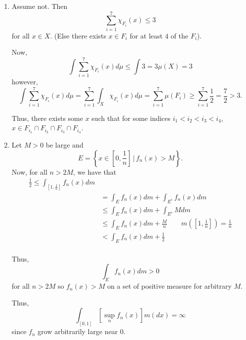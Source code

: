 \documentclass[12pt]{Qual}
\begin{document}
\begin{solution}$\,$
\begin{enumerate}[label=(\alph*)]
    \item Assume not. Then $$\sum_{i=1}^7\chi_{F_i}(x)\le3$$ for all $x\in X$. (Else there exists $x\in F_i$ for at least $4$ of the $F_i$).

    Now, $$\int\sum_{i=1}^7\chi_{F_i}(x)d\mu\le\int 3=3\mu(X)=3$$ however, $$\int\sum_{i=1}^7\chi_{F_i}(x)d\mu=\sum_{i=1}^7\int_X\chi_{F_i}(x)d\mu=\sum_{i=1}^7\mu(F_i)\ge\sum_{i=1}^7\frac{1}{2}=\frac{7}{2}>3.$$

    Thus, there exists some $x$ such that for some indices $i_1<i_2<i_3<i_4$, $x\in F_{i_1}\cap F_{i_2}\cap F_{i_3}\cap F_{i_4}$.
    \item Let $M>0$ be large and $$E=\left\{x\in\left[0,\frac{1}{n}\right]\,|\,f_n(x)>M\right\}.$$ Now, for all $n>2M$, we have that \begin{align*}
        \frac{1}{2}\le\int_{[1,\frac{1}{n}]}f_n(x)dm\\
        &=\int_Ef_n(x)dm+\int_{E^c}f_n(x)dm\\
        &\le\int_E f_n(x)dm+\int_{E^c}Mdm\\
        &\le \int_E f_n(x)dm+\frac{M}{n}\qquad m\left(\left[1,\frac{1}{n}\right]\right)=\frac{1}{n}\\
        &<\int_E f_n(x)dm+\frac{1}{2}\\
    \end{align*}

    Thus, $$\int_E f_n(x)dm>0$$ for all $n>2M$ so $f_n(x)>M$ on a set of positive measure for arbitrary $M$.

    Thus, $$\int_{[0,1]}[\sup_nf_n(x)]m(dx)=\infty$$ since $f_n$ grow arbitrarily large near $0$.
\end{enumerate}
\end{solution}
\vspace{0.5cm}
\end{document}

